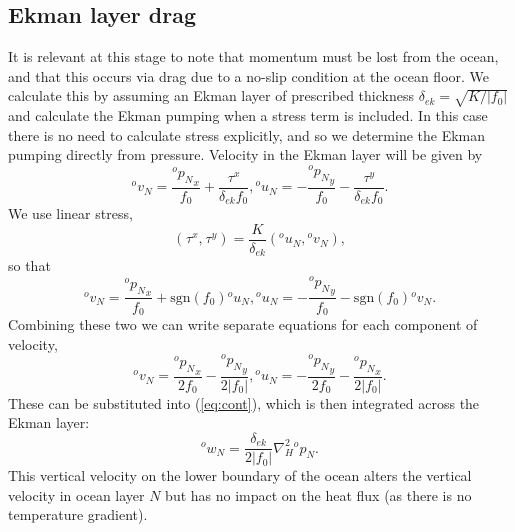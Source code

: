 \documentclass[11pt, a4paper,twoside]{article}
\newcommand{\p}[2]{{{}^{#1}p_{#2}}}
\newcommand{\uu}[2]{{{}^{#1}u_{#2}}}
\newcommand{\vv}[2]{{{}^{#1}v_{#2}}}
\newcommand{\ww}[2]{{{}^{#1}w_{#2}}}
\newcommand{\tx}[2]{{}^{#1}\tau^{#2}}
\newcommand{\delek}[0]{\delta_{ek}}
\numberwithin{equation}{section}
\begin{document}
\subsection{Ekman layer drag}
It is relevant at this stage to note that momentum must be lost from the ocean, and that this occurs via drag due to a no-slip condition at the ocean floor.
We calculate this by assuming an Ekman layer of prescribed thickness  $\delek= \sqrt{K/\lvert f_0\rvert}$ and calculate the Ekman pumping when a stress term is included.
In this case there is no need to calculate stress explicitly, and so we determine the Ekman pumping directly from pressure.
Velocity in the Ekman layer will be given by
\begin{subequations}
\begin{equation}
\vv{o}{N} = \frac{\p{o}{N}_x}{f_0} + \frac{\tx{}{x}}{\delek f_0},
\end{equation}
\begin{equation}
\uu{o}{N} = -\frac{\p{o}{N}_y}{f_0} - \frac{\tx{}{y}}{\delek f_0}.
\end{equation}
\end{subequations}
We use linear stress,
\begin{equation}
(\tx{}{x},\tx{}{y}) = \frac{K}{\delek}(\uu{o}{N},\vv{o}{N}),
\end{equation}
so that
\begin{subequations}
\begin{equation}
\vv{o}{N} = \frac{\p{o}{N}_x}{f_0} + \textrm{sgn}(f_0) \uu{o}{N},
\end{equation}
\begin{equation}
\uu{o}{N} = -\frac{\p{o}{N}_y}{f_0} -  \textrm{sgn}(f_0) \vv{o}{N}.
\end{equation}
\end{subequations}
Combining these two we can write separate equations for each component of velocity,
\begin{subequations}
\begin{equation}
\vv{o}{N} = \frac{\p{o}{N}_x}{2f_0} -\frac{\p{o}{N}_y}{2 \lvert f_0 \rvert},
\end{equation}
\begin{equation}
\uu{o}{N} = -\frac{\p{o}{N}_y}{2f_0} - \frac{\p{o}{N}_x}{2 \lvert f_0 \rvert }.
\end{equation}
\end{subequations}
These can be substituted into (\ref{eq:cont}), which is then integrated across the Ekman layer:
\begin{equation}\label{eq:contz}
\ww{o}{N} = \frac{\delek}{2 \lvert f_0 \rvert } \nabla_H^2\p{o}{N}.
\end{equation}
This vertical velocity on the lower  boundary of the ocean alters the vertical velocity in ocean layer $N$ but has no impact on the heat flux (as there is no temperature gradient).
\end{document}
